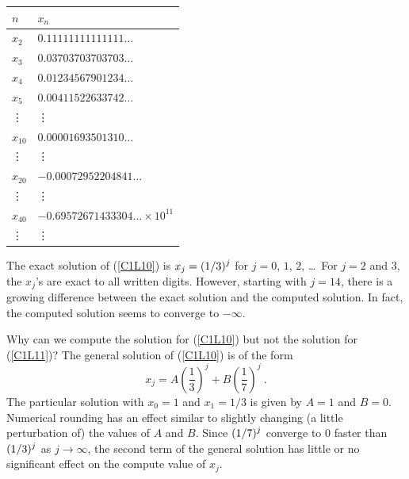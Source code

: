\begin{longtable}{l|l}
\hline
$n$ & $x_n$ \\
\hline
$x_2$ & $0.11111111111111\ldots$ \\
$x_3$ & $0.03703703703703\ldots$ \\
$x_4$ & $0.01234567901234\ldots$ \\
$x_5$ & $0.00411522633742\ldots$ \\
\vdots & \qquad \vdots \\
$x_{10}$ & $0.00001693501310\ldots$ \\
\vdots & \qquad \vdots \\
$x_{20}$ & $-0.00072952204841\ldots$ \\
\vdots & \qquad \vdots \\
$x_{40}$ & $-0.69572671433304\ldots \times 10^{11}$ \\
\vdots & \qquad \vdots \\
\hline
\end{longtable}


The exact solution of (\ref{C1L10}) is $\displaystyle x_j = (1/3)^j$ for
$j=0$, $1$, $2$, \ldots\  For $j=2$ and $3$, the $x_j$'s are exact to
all written digits.  However, starting with $j=14$, there is a growing
difference between the exact solution and the computed solution.  In
fact, the computed solution seems to converge to $-\infty$.

Why can we compute the solution for (\ref{C1L10}) but not
the solution for (\ref{C1L11})?  The general solution of
(\ref{C1L10}) is of the form
\[
x_j = A \left(\frac{1}{3}\right)^j + B \left(\frac{1}{7}\right)^j \ .
\]
The particular solution with $x_0=1$ and $x_1 = 1/3$ is given
by $A=1$ and $B=0$.  Numerical rounding has an effect similar to
slightly changing (a little perturbation of) the values of $A$ and
$B$. Since $\displaystyle (1/7)^j$ converge to $0$ faster than
$\displaystyle (1/3)^j$ as
$j\rightarrow \infty$, the second term of the general solution has
little or no significant effect on the compute value of $x_j$.

